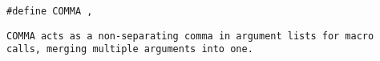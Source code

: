 
\tt{#define COMMA ,}


\tt{COMMA} acts as a non-separating comma in argument lists for macro calls,
merging multiple arguments into one.
